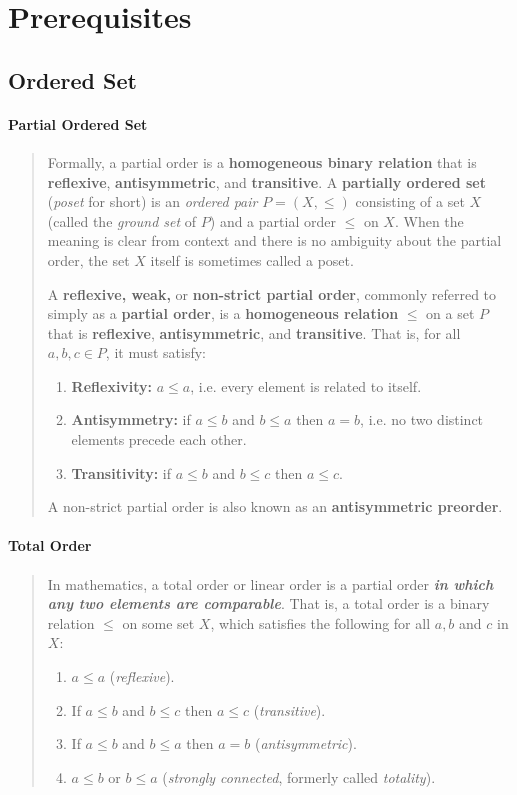 \documentclass[a4paper, 11pt]{article}
\begin{document}
\section{Prerequisites}
\subsection{Ordered Set}
\paragraph{Partial Ordered Set}
    \begin{quote}
        Formally, a partial order is a \textbf{homogeneous binary relation} that is \textbf{reflexive}, \textbf{antisymmetric}, and \textbf{transitive}. 
        A \textbf{partially ordered set} (\textit{poset} for short) is an \textit{ordered pair} $P = (X, \le)$ consisting of a set $X$ (called the 
        \textit{ground set} of $P$) and a partial order $\le$ on $X$. When the meaning is clear from context and there is no ambiguity about the partial 
        order, the set $X$ itself is sometimes called a poset.

        A \textbf{reflexive, weak,} or \textbf{non-strict partial order}, commonly referred to simply as a \textbf{partial order}, is a \textbf{homogeneous relation} $\le$ on a set $P$ that is \textbf{reflexive}, \textbf{antisymmetric}, and \textbf{transitive}. That is, for all $a, b, c \in P$, it must satisfy:
        \begin{enumerate}
            \item \textbf{Reflexivity:} $a \le a$, i.e. every element is related to itself.
            \item \textbf{Antisymmetry:} if $a \le b$ and $b \le a$ then $a = b$, i.e. no two distinct elements precede each other.
            \item \textbf{Transitivity:} if $a \le b$ and $b \le c$ then $a \le c$.
        \end{enumerate}
        A non-strict partial order is also known as an \textbf{antisymmetric preorder}.
    \end{quote}
\paragraph{Total Order}
    \begin{quote}
        In mathematics, a total order or linear order is a partial order \emph{\textbf{in which any two elements are comparable}}. That 
        is, a total order is a binary relation $\le$ on some set $X$, which satisfies the following for all $a, b$ and $c$ in $X$:
        \begin{enumerate}
            \item $a \le a$ (\textit{reflexive}).
            \item If $a \le b$ and $b \le c$ then $a \le c$ (\textit{transitive}).
            \item If $a \le b$ and $b \le a$ then $a = b$ (\textit{antisymmetric}).
            \item $a \le b$ or $b \le a$ (\textit{strongly connected}, formerly called \textit{totality}).
        \end{enumerate}
    \end{quote}
\end{document}
